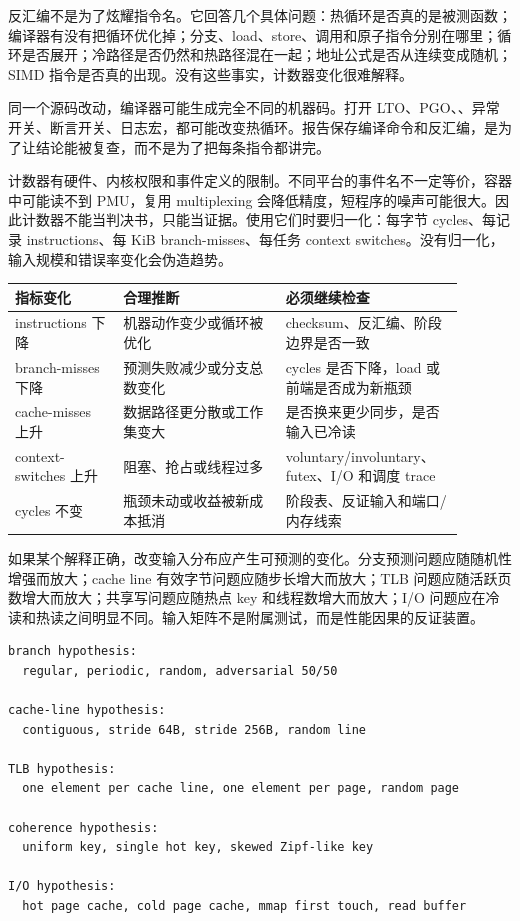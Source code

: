 反汇编不是为了炫耀指令名。它回答几个具体问题：热循环是否真的是被测函数；编译器有没有把循环优化掉；分支、load、store、调用和原子指令分别在哪里；循环是否展开；冷路径是否仍然和热路径混在一起；地址公式是否从连续变成随机；SIMD 指令是否真的出现。没有这些事实，计数器变化很难解释。

同一个源码改动，编译器可能生成完全不同的机器码。打开 LTO、PGO、、异常开关、断言开关、日志宏，都可能改变热循环。报告保存编译命令和反汇编，是为了让结论能被复查，而不是为了把每条指令都讲完。

计数器有硬件、内核权限和事件定义的限制。不同平台的事件名不一定等价，容器中可能读不到 PMU，复用 multiplexing 会降低精度，短程序的噪声可能很大。因此计数器不能当判决书，只能当证据。使用它们时要归一化：每字节 cycles、每记录 instructions、每 KiB branch-misses、每任务 context switches。没有归一化，输入规模和错误率变化会伪造趋势。

\begin{center}
\small
\begin{tabular}{@{}p{0.22\linewidth}p{0.33\linewidth}p{0.34\linewidth}@{}}
\toprule
指标变化 & 合理推断 & 必须继续检查 \\
\midrule
instructions 下降 & 机器动作变少或循环被优化 & checksum、反汇编、阶段边界是否一致 \\
branch-misses 下降 & 预测失败减少或分支总数变化 & cycles 是否下降，load 或前端是否成为新瓶颈 \\
cache-misses 上升 & 数据路径更分散或工作集变大 & 是否换来更少同步，是否输入已冷读 \\
context-switches 上升 & 阻塞、抢占或线程过多 & voluntary/involuntary、futex、I/O 和调度 trace \\
cycles 不变 & 瓶颈未动或收益被新成本抵消 & 阶段表、反证输入和端口/内存线索 \\
\bottomrule
\end{tabular}
\end{center}

如果某个解释正确，改变输入分布应产生可预测的变化。分支预测问题应随随机性增强而放大；cache line 有效字节问题应随步长增大而放大；TLB 问题应随活跃页数增大而放大；共享写问题应随热点 key 和线程数增大而放大；I/O 问题应在冷读和热读之间明显不同。输入矩阵不是附属测试，而是性能因果的反证装置。

\begin{lstlisting}[numbers=none,caption={按瓶颈假设设计输入矩阵}]
branch hypothesis:
  regular, periodic, random, adversarial 50/50

cache-line hypothesis:
  contiguous, stride 64B, stride 256B, random line

TLB hypothesis:
  one element per cache line, one element per page, random page

coherence hypothesis:
  uniform key, single hot key, skewed Zipf-like key

I/O hypothesis:
  hot page cache, cold page cache, mmap first touch, read buffer
\end{lstlisting}


